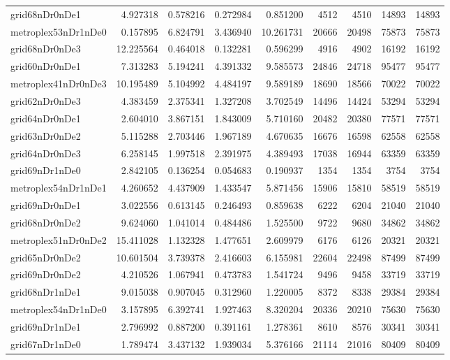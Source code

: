 \begin{longtable}{|l|r|r|r|r|r|r|r|r|}
grid68nDr0nDe1 & 4.927318 & 0.578216 & 0.272984 & 0.851200 & 4512 & 4510 & 14893 & 14893 \\
metroplex53nDr1nDe0 & 0.157895 & 6.824791 & 3.436940 & 10.261731 & 20666 & 20498 & 75873 & 75873 \\
grid68nDr0nDe3 & 12.225564 & 0.464018 & 0.132281 & 0.596299 & 4916 & 4902 & 16192 & 16192 \\
grid60nDr0nDe1 & 7.313283 & 5.194241 & 4.391332 & 9.585573 & 24846 & 24718 & 95477 & 95477 \\
metroplex41nDr0nDe3 & 10.195489 & 5.104992 & 4.484197 & 9.589189 & 18690 & 18566 & 70022 & 70022 \\
grid62nDr0nDe3 & 4.383459 & 2.375341 & 1.327208 & 3.702549 & 14496 & 14424 & 53294 & 53294 \\
grid64nDr0nDe1 & 2.604010 & 3.867151 & 1.843009 & 5.710160 & 20482 & 20380 & 77571 & 77571 \\
grid63nDr0nDe2 & 5.115288 & 2.703446 & 1.967189 & 4.670635 & 16676 & 16598 & 62558 & 62558 \\
grid64nDr0nDe3 & 6.258145 & 1.997518 & 2.391975 & 4.389493 & 17038 & 16944 & 63359 & 63359 \\
grid69nDr1nDe0 & 2.842105 & 0.136254 & 0.054683 & 0.190937 & 1354 & 1354 & 3754 & 3754 \\
metroplex54nDr1nDe1 & 4.260652 & 4.437909 & 1.433547 & 5.871456 & 15906 & 15810 & 58519 & 58519 \\
grid69nDr0nDe1 & 3.022556 & 0.613145 & 0.246493 & 0.859638 & 6222 & 6204 & 21040 & 21040 \\
grid68nDr0nDe2 & 9.624060 & 1.041014 & 0.484486 & 1.525500 & 9722 & 9680 & 34862 & 34862 \\
metroplex51nDr0nDe2 & 15.411028 & 1.132328 & 1.477651 & 2.609979 & 6176 & 6126 & 20321 & 20321 \\
grid65nDr0nDe2 & 10.601504 & 3.739378 & 2.416603 & 6.155981 & 22604 & 22498 & 87499 & 87499 \\
grid69nDr0nDe2 & 4.210526 & 1.067941 & 0.473783 & 1.541724 & 9496 & 9458 & 33719 & 33719 \\
grid68nDr1nDe1 & 9.015038 & 0.907045 & 0.312960 & 1.220005 & 8372 & 8338 & 29384 & 29384 \\
metroplex54nDr1nDe0 & 3.157895 & 6.392741 & 1.927463 & 8.320204 & 20336 & 20210 & 75630 & 75630 \\
grid69nDr1nDe1 & 2.796992 & 0.887200 & 0.391161 & 1.278361 & 8610 & 8576 & 30341 & 30341 \\
grid67nDr1nDe0 & 1.789474 & 3.437132 & 1.939034 & 5.376166 & 21114 & 21016 & 80409 & 80409 \\

\end{longtable}
